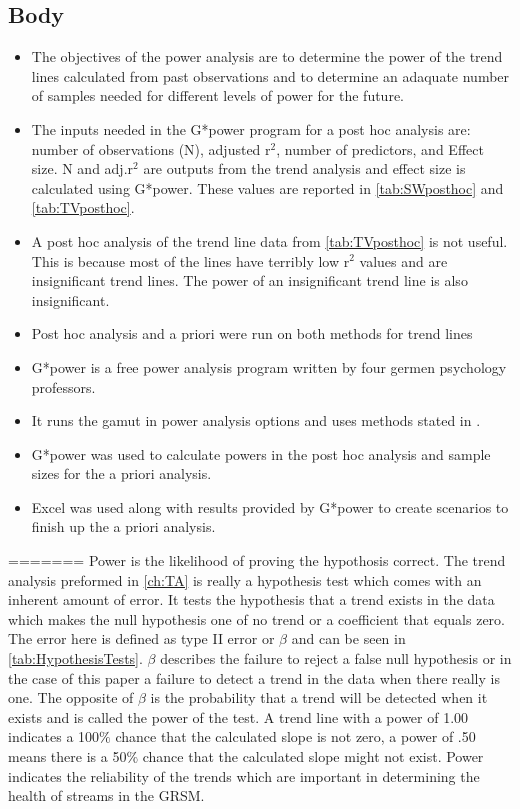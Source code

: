 \subsection{Body}
\begin{itemize}
	\item The objectives of the power analysis are to determine the power of the trend lines calculated from past observations and to determine an adaquate number of samples needed for different levels of power for the future.
	\item The inputs needed in the G*power program for a post hoc analysis are: number of observations (N), adjusted r$^2$, number of predictors, and Effect size.  N and adj.r$^2$ are  outputs from the trend analysis and effect size is calculated using G*power.  These values are reported in \autoref{tab:SWposthoc} and \autoref{tab:TVposthoc}.
	\item A post hoc analysis of the trend line data from \autoref{tab:TVposthoc} is not useful.  This is because most of the lines have terribly low r$^2$ values and are insignificant trend lines.  The power of an insignificant trend line is also insignificant.
	\item Post hoc analysis and a priori were  run on both methods for trend lines
	\item G*power is a free power analysis program written by four germen psychology professors.
	\item It runs the gamut in power analysis options and uses methods stated in \citep{cohen1992power}.
	\item G*power was used to calculate powers in the post hoc analysis and sample sizes for the a priori analysis.
	\item Excel was used along with results provided by G*power to create scenarios to finish up the a priori analysis.
\end{itemize}
=======
Power is the likelihood of proving the hypothosis correct.
The trend analysis  preformed in \autoref{ch:TA} is really a hypothesis test which comes with an inherent amount of error.  
It tests the hypothesis that a trend exists in the data which makes the null hypothesis one of no trend or a coefficient that equals zero.
The error here is defined as type II error or $\beta$ and can be seen in \autoref{tab:HypothesisTests}.
$\beta$ describes the failure to reject a false null hypothesis or in the case of this paper a failure to detect a trend in the data when there really is one.
The opposite of $\beta$ is the probability that a trend will be detected when it exists and is called the power of the test.
A trend line with a power of 1.00 indicates a 100$\%$ chance that the calculated slope is not zero, a power of .50 means there is a 50$\%$ chance that the calculated slope might not exist.
Power indicates the reliability of the trends which are important in determining the health of streams in the GRSM.

